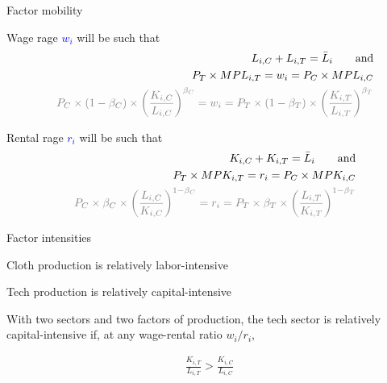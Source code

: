 \documentclass[notes,11pt, aspectratio=169, xcolor=table]{beamer}
\newcommand{\blue}[1]{\textcolor{blue}{#1}}
\newenvironment{wideitemize}{\itemize\addtolength{\itemsep}{10pt}}{\enditemize}
\begin{document}
\begin{frame}{Factor mobility}
\begin{wideitemize}
    
        \item Wage rage \blue{$w_i$} will be such that
        \begin{eqnarray*}
            & & L_{i,C} + L_{i,T} = \bar{L}_i  \qquad \text{and} \\
            & & P_T \times MPL_{i,T} = w_i = 
            P_C \times MPL_{i,C} \\
            & & \textcolor{gray}{P_{C} \times (1-\beta_C) \times \left( \frac{K_{i,C}}{L_{i,C}} \right)^{\beta_C} = w_i = P_{T} \times (1-\beta_T) \times \left( \frac{K_{i,T}}{L_{i,T}} \right)^{\beta_T}}
        \end{eqnarray*}

        \item<2-> Rental rage \blue{$r_i$} will be such that
        \begin{eqnarray*}
            & & K_{i,C} + K_{i,T} = \bar{L}_i \qquad \text{and} \\
            & & P_T \times MPK_{i,T} = r_i = 
            P_C \times MPK_{i,C}   \\
            & & \textcolor{gray}{P_{C} \times  \beta_C \times \left( \frac{L_{i,C}}{K_{i,C}} \right)^{1-\beta_C} = r_i = P_{T}  \times \beta_T \times \left( \frac{L_{i,T}}{K_{i,T}} \right)^{1-\beta_T}}
        \end{eqnarray*}


\end{wideitemize}    
\end{frame}

\begin{frame}{Factor intensities}
\begin{wideitemize}
    
        \item Cloth production is relatively labor-intensive
        \item Tech production is relatively capital-intensive

        \item<2-> With two sectors and two factors of production, the tech sector is relatively capital-intensive if, at any wage-rental ratio $w_i/r_i$,

        \begin{eqnarray*}
            \frac{K_{i,T}}{L_{i,T}} > \frac{K_{i,C}}{L_{i,C}} 
        \end{eqnarray*}

\end{wideitemize}    
\end{frame}
\end{document}
